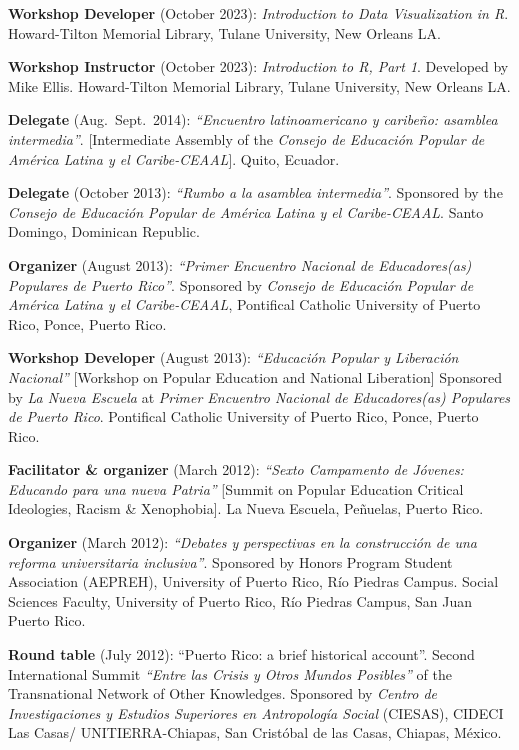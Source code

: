 \documentclass[11pt,a4paper,]{awesome-cv}
\begin{document}
\textbf{Workshop Developer} (October 2023): \emph{Introduction to Data
Visualization in R}. Howard-Tilton Memorial Library, Tulane University,
New Orleans LA.

\textbf{Workshop Instructor} (October 2023): \emph{Introduction to R,
Part 1}. Developed by Mike Ellis. Howard-Tilton Memorial Library, Tulane
University, New Orleans LA.

\textbf{Delegate} (Aug.~Sept.~2014): \emph{``Encuentro latinoamericano y
caribeño: asamblea intermedia''}. {[}Intermediate Assembly of the
\emph{Consejo de Educación Popular de América Latina y el
Caribe-CEAAL}{]}. Quito, Ecuador.

\textbf{Delegate} (October 2013): \emph{``Rumbo a la asamblea
intermedia''}. Sponsored by the \emph{Consejo de Educación Popular de
América Latina y el Caribe-CEAAL}. Santo Domingo, Dominican Republic.

\textbf{Organizer} (August 2013): \emph{``Primer Encuentro Nacional de
Educadores(as) Populares de Puerto Rico''}. Sponsored by \emph{Consejo
de Educación Popular de América Latina y el Caribe-CEAAL}, Pontifical
Catholic University of Puerto Rico, Ponce, Puerto Rico.

\textbf{Workshop Developer} (August 2013): \emph{``Educación Popular y
Liberación Nacional''} {[}Workshop on Popular Education and National
Liberation{]} Sponsored by \emph{La Nueva Escuela} at \emph{Primer
Encuentro Nacional de Educadores(as) Populares de Puerto Rico}.
Pontifical Catholic University of Puerto Rico, Ponce, Puerto Rico.

\textbf{Facilitator \& organizer} (March 2012): \emph{``Sexto Campamento
de Jóvenes: Educando para una nueva Patria''} {[}Summit on Popular
Education Critical Ideologies, Racism \& Xenophobia{]}. La Nueva
Escuela, Peñuelas, Puerto Rico.

\textbf{Organizer} (March 2012): \emph{``Debates y perspectivas en la
construcción de una reforma universitaria inclusiva''}. Sponsored by
Honors Program Student Association (AEPREH), University of Puerto Rico,
Río Piedras Campus. Social Sciences Faculty, University of Puerto Rico,
Río Piedras Campus, San Juan Puerto Rico.

\textbf{Round table} (July 2012): ``Puerto Rico: a brief historical
account''. Second International Summit \emph{``Entre las Crisis y Otros
Mundos Posibles''} of the Transnational Network of Other Knowledges.
Sponsored by \emph{Centro de Investigaciones y Estudios Superiores en
Antropología Social} (CIESAS), CIDECI Las Casas/ UNITIERRA-Chiapas, San
Cristóbal de las Casas, Chiapas, México.
\end{document}
